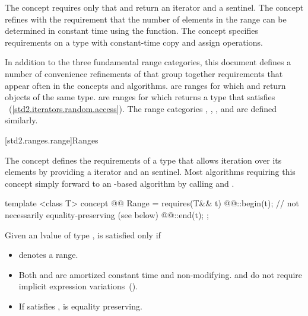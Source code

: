 \pnum
The  concept requires only that  and 
return an iterator and a sentinel. The  concept refines 
with the requirement that the number of elements in the range can be determined
in constant time using the  function. The  concept
specifies requirements on a  type
with constant-time copy and assign operations.

\pnum
In addition to the three fundamental range categories, this document defines
a number of convenience refinements of  that group together requirements
that appear often in the concepts and algorithms.
 are ranges for which  and  return objects of the
same type.  are ranges for which
 returns a type that satisfies
~(\ref{std2.iterators.random.access}). The range
categories ,
,
, and
 are defined similarly.

[std2.ranges.range]{Ranges}

\pnum
The  concept defines the requirements of a type that allows
iteration over its elements by providing a  iterator and an
 sentinel.
\enternote Most algorithms requiring this concept simply forward to an
-based algorithm by calling  and . \exitnote

\begin{itemdecl}
template <class T>
concept @@ Range =
  requires(T&& t) {
    @@::begin(t); // not necessarily equality-preserving (see below)
    @@::end(t);
  };
\end{itemdecl}

\begin{itemdescr}

\pnum
Given an lvalue  of type ,  is satisfied
only if

\begin{itemize}
\item {} denotes a range.

\item Both  and  are amortized constant time
and non-modifying. \enternote {} and  do not require
implicit expression variations~(). \exitnote

\item If  satisfies ,
 is equality preserving.
\end{itemize}
\end{itemdescr}

